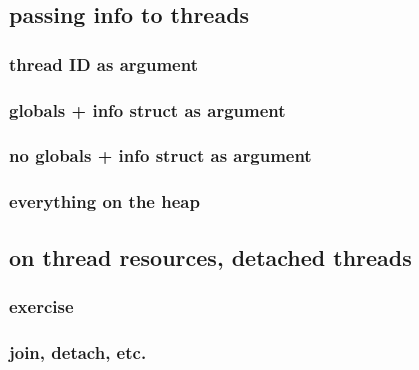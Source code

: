\subsection{passing info to threads}

\subsubsection{thread ID as argument}


\subsubsection{globals + info struct as argument}



\subsubsection{no globals + info struct as argument}



\subsubsection{everything on the heap}



\subsection{on thread resources, detached threads}

\subsubsection{exercise}


\subsubsection{join, detach, etc.}




